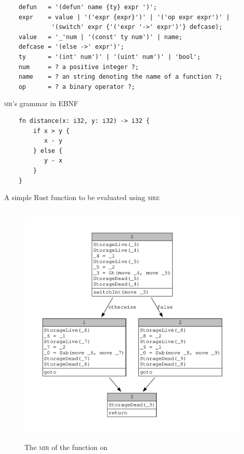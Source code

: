 \begin{listing}[h]
    \begin{verbatim}
    defun   = '(defun' name {ty} expr ')';
    expr    = value | '('expr {expr}')' | '('op expr expr')' | 
             '(switch' expr {'('expr '->' expr')'} defcase);
    value   = '_'num | '(const' ty num')' | name;
    defcase = '(else ->' expr')';
    ty      = '(int' num')' | '(uint' num')' | 'bool';
    num     = ? a positive integer ?;
    name    = ? an string denoting the name of a function ?;
    op      = ? a binary operator ?;
    \end{verbatim}
    \caption{\textsc{sir}'s grammar in EBNF}
  \label{lst:sir_grammar}
\end{listing}

\begin{listing}[h]
    \begin{verbatim}
    fn distance(x: i32, y: i32) -> i32 {
        if x > y {
           x - y
        } else {
           y - x
        }
    }
    \end{verbatim}
    \caption{A simple Rust function to be evaluated using \textsc{sire}}
  \label{lst:rust_sire_example}
\end{listing}

\begin{figure}[h]
    \centering
    \includegraphics[height=12cm]{images/distance.pdf}
    \caption{The \textsc{mir} of the  function on }
  \label{lst:mir_sire_example}
\end{figure}


